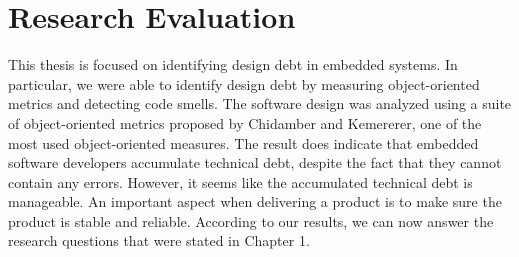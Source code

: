 



\section{Research Evaluation}


This thesis is focused on identifying design debt in embedded systems. In particular, we were able to identify design debt by measuring object-oriented metrics and detecting code smells. The software design was analyzed using a suite of object-oriented metrics proposed by Chidamber and Kemererer, one of the most used object-oriented measures. The result does indicate that embedded software developers accumulate technical debt, despite the fact that they cannot contain any errors\cite{pretschner2007software,ebert2009embedded,trienekens2010quality}. However, it seems like the accumulated technical debt is manageable. An important aspect when delivering a product is to make sure the product is stable and reliable. According to our results, we can now answer the research questions that were stated in Chapter 1.





